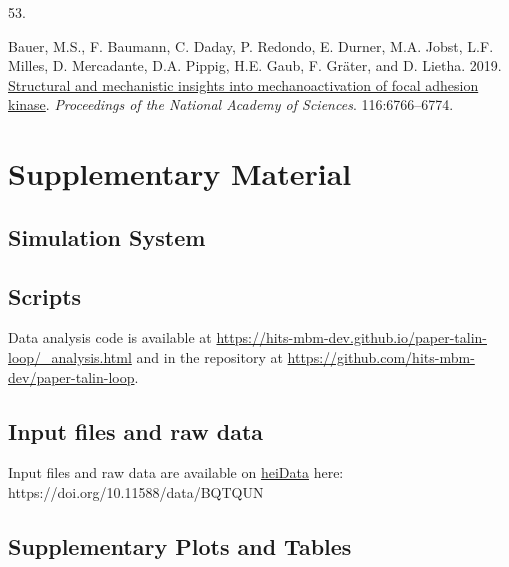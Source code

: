 \documentclass[
  twocolumn]{biophys-new-mod}
\newlength{\cslhangindent}
\newlength{\csllabelwidth}
\newlength{\cslentryspacingunit} %
\newenvironment{CSLReferences}[2] %
 {%
  \setlength{\parindent}{0pt}
  \ifodd #1
  \let\oldpar\par
  \def\par{\hangindent=\cslhangindent\oldpar}
  \fi
  \setlength{\parskip}{#2\cslentryspacingunit}
 }%
 {}
\newcommand{\CSLLeftMargin}[1]{\parbox[t]{\csllabelwidth}{#1}}
\newcommand{\CSLRightInline}[1]{\parbox[t]{\linewidth - \csllabelwidth}{#1}\break}
\begin{document}
\begin{CSLReferences}{0}{0}
\leavevmode{}%
\CSLLeftMargin{53. }%
\CSLRightInline{Bauer, M.S., F. Baumann, C. Daday, P. Redondo, E.
Durner, M.A. Jobst, L.F. Milles, D. Mercadante, D.A. Pippig, H.E. Gaub,
F. Gräter, and D. Lietha. 2019.
\href{https://doi.org/10.1073/pnas.1820567116}{Structural and
mechanistic insights into mechanoactivation of focal adhesion kinase}.
\emph{Proceedings of the National Academy of Sciences}. 116:6766--6774.}

\end{CSLReferences}

\newpage

\hypertarget{supplementary-material}{%
\section{Supplementary Material}\label{supplementary-material}}

\hypertarget{sec-system}{%
\subsection{Simulation System}\label{sec-system}}

\hypertarget{scripts}{%
\subsection{Scripts}\label{scripts}}

Data analysis code is available at
\url{https://hits-mbm-dev.github.io/paper-talin-loop/_analysis.html} and
in the repository at
\url{https://github.com/hits-mbm-dev/paper-talin-loop}.

\hypertarget{sec-data}{%
\subsection{Input files and raw data}\label{sec-data}}

Input files and raw data are available on
\href{https://heidata.uni-heidelberg.de/}{heiData} here:
https://doi.org/10.11588/data/BQTQUN

\hypertarget{supplementary-plots-and-tables}{%
\subsection{Supplementary Plots and
Tables}\label{supplementary-plots-and-tables}}
\end{document}
